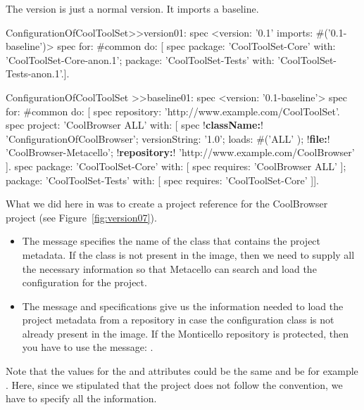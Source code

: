 \documentclass[a4paper,10pt,twoside]{book}
\begin{document}
The version is just a normal version. It imports a baseline. 
\begin{code}{}
ConfigurationOfCoolToolSet>>version01: spec 
	<version: '0.1' imports: #('0.1-baseline')>
	spec for: #common do: [
		spec 
			package: 'CoolToolSet-Core' with: 'CoolToolSet-Core-anon.1';
			package: 'CoolToolSet-Tests' with: 'CoolToolSet-Tests-anon.1'.].	
\end{code}	



\begin{code}{}
ConfigurationOfCoolToolSet >>baseline01: spec 
	<version: '0.1-baseline'>
	spec for: #common do: [
		spec repository: 'http://www.example.com/CoolToolSet'.
		spec project: 'CoolBrowser ALL' with: [
				spec 
				     !\textbf{className:}! 'ConfigurationOfCoolBrowser';
					versionString: '1.0';
					loads: #('ALL' );
					!\textbf{file:}! 'CoolBrowser-Metacello';
					!\textbf{repository:}! 'http://www.example.com/CoolBrowser' ].
		spec 
			package: 'CoolToolSet-Core' with: [ spec requires: 'CoolBrowser ALL' ];
			package: 'CoolToolSet-Tests' with: [ spec requires: 'CoolToolSet-Core' ]].
\end{code}	







What we did here in  was to create a project reference for the CoolBrowser project (see Figure~\ref{fig:version07}). 

\begin{itemize}
\item The message  specifies the name of the class that contains the project metadata. If the class is not present in the image, then we need to supply all the necessary information so that Metacello can search and load the configuration for the project.


\item The message  and  specifications give us the information needed to load the project metadata from a repository in case the configuration class is not already present in the image. If the Monticello repository is protected, then you have to use the message: .

\end{itemize}
Note that the values for the  and  attributes could be the same and be for example . Here, since we stipulated that the project does not follow the convention, we have to specify all the information. 
\end{document}
